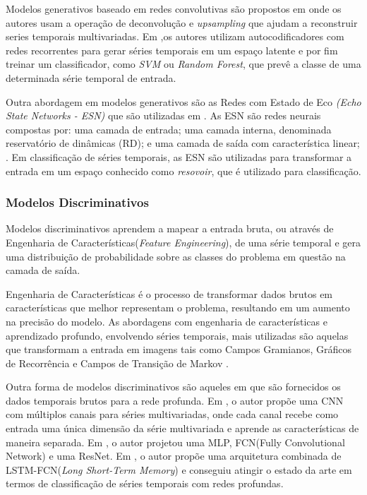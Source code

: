 Modelos generativos baseado em redes convolutivas são propostos em \cite{autoencoder1} \cite{autoencoder2} onde os autores usam a operação de deconvolução e \textit{upsampling} que ajudam a reconstruir series temporais multivariadas. Em \cite{autoencoder3} \cite{autoencoder4},os autores utilizam autocodificadores com redes recorrentes para gerar séries temporais em um espaço latente e por fim treinar um classificador, como \textit{SVM} ou \textit{Random Forest}, que prevê a classe de uma determinada série temporal de entrada. 

Outra abordagem em modelos generativos são as Redes com Estado de Eco \textit{(Echo State Networks - ESN)} que são utilizadas em \cite{ESN1} \cite{ESN2}. As ESN são redes neurais compostas por: uma camada de entrada; uma camada interna, denominada reservatório de dinâmicas (RD); e uma camada de saída com característica linear; \cite{marton2018}. Em classificação de séries temporais, as ESN são utilizadas para transformar a entrada em um espaço conhecido como \textit{resovoir}, que é utilizado para classificação.
  
\subsubsection{Modelos Discriminativos}
Modelos discriminativos aprendem a mapear a entrada bruta, ou através de Engenharia de Características(\textit{Feature Engineering}), de uma série temporal e gera uma distribuição de probabilidade sobre as classes do problema em questão na camada de saída. 

Engenharia de Características é o processo de transformar dados brutos em características que melhor representam o problema, resultando em um aumento na precisão do modelo\cite{mlmastery}. As abordagens com engenharia de características e aprendizado profundo, envolvendo séries temporais, mais utilizadas são aquelas que transformam a entrada em imagens tais como Campos Gramianos, Gráficos de Recorrência e Campos de Transição de Markov \cite{Wang01} \cite{TRIPATHY2018} \cite{Wang02}. 

Outra forma de modelos discriminativos são aqueles em que são fornecidos os dados temporais brutos para a rede profunda.  Em \cite{Zheng2014}, o autor propõe uma CNN com múltiplos canais para séries multivariadas, onde cada canal recebe como entrada uma única dimensão da série multivariada e aprende as características de maneira separada. Em \cite{tscFromScratch}, o autor projetou uma MLP, FCN(Fully Convolutional Network) e uma ResNet. Em \cite{karim2018}, o autor propõe uma arquitetura combinada de LSTM-FCN(\textit{Long Short-Term Memory}) e conseguiu atingir o estado da arte em termos de classificação de séries temporais com redes profundas. 




